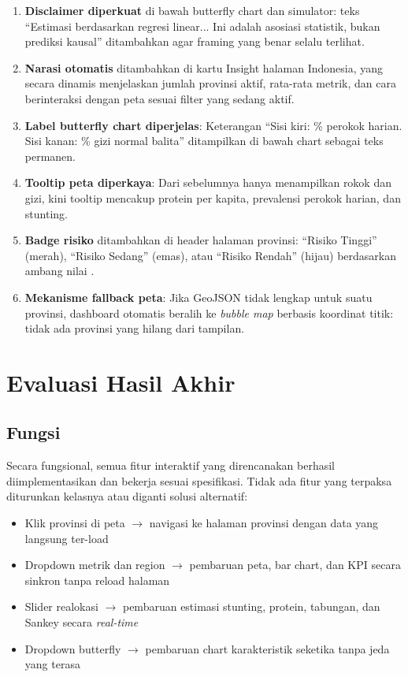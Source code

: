 \begin{enumerate}
  \item \textbf{Disclaimer diperkuat} di bawah butterfly chart dan simulator: teks ``Estimasi berdasarkan regresi linear... Ini adalah asosiasi statistik, bukan prediksi kausal'' ditambahkan agar framing yang benar selalu terlihat.
  \item \textbf{Narasi otomatis} ditambahkan di kartu Insight halaman Indonesia, yang secara dinamis menjelaskan jumlah provinsi aktif, rata-rata metrik, dan cara berinteraksi dengan peta sesuai filter yang sedang aktif.
  \item \textbf{Label butterfly chart diperjelas}: Keterangan ``Sisi kiri: \% perokok harian. Sisi kanan: \% gizi normal balita'' ditampilkan di bawah chart sebagai teks permanen.
  \item \textbf{Tooltip peta diperkaya}: Dari sebelumnya hanya menampilkan rokok dan gizi, kini tooltip mencakup protein per kapita, prevalensi perokok harian, dan stunting.
  \item \textbf{Badge risiko} ditambahkan di header halaman provinsi: ``Risiko Tinggi'' (merah), ``Risiko Sedang'' (emas), atau ``Risiko Rendah'' (hijau) berdasarkan ambang nilai .
  \item \textbf{Mekanisme fallback peta}: Jika GeoJSON tidak lengkap untuk suatu provinsi, dashboard otomatis beralih ke \textit{bubble map} berbasis koordinat titik: tidak ada provinsi yang hilang dari tampilan.
\end{enumerate}

\section{Evaluasi Hasil Akhir}

\subsection{Fungsi}

Secara fungsional, semua fitur interaktif yang direncanakan berhasil diimplementasikan dan bekerja sesuai spesifikasi. Tidak ada fitur yang terpaksa diturunkan kelasnya atau diganti solusi alternatif:

\begin{itemize}
  \item Klik provinsi di peta $\to$ navigasi ke halaman provinsi dengan data yang langsung ter-load
  \item Dropdown metrik dan region $\to$ pembaruan peta, bar chart, dan KPI secara sinkron tanpa reload halaman
  \item Slider realokasi $\to$ pembaruan estimasi stunting, protein, tabungan, dan Sankey secara \textit{real-time}
  \item Dropdown butterfly $\to$ pembaruan chart karakteristik seketika tanpa jeda yang terasa
\end{itemize}

